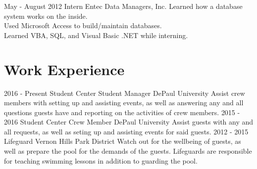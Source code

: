 \documentclass[]{resume-class}
\begin{document}
    \begin{entrylist}
        \entry
            {May - August 2012}
            {Intern}
            {Entec Data Managers, Inc.}
            {Learned how a database system works on the inside.\\
            Used Microsoft Access to build/maintain databases.\\
            Learned VBA, SQL, and Visual Basic .NET while interning.}
    \end{entrylist}

\section{Work Experience}

    \begin{entrylist}
        \entry
            {2016 - Present}
            {Student Center Student Manager}
            {DePaul University}
            {Assist crew members with setting up and assisting events, as well as answering any and all questions guests have and reporting on the activities of crew members.}
        \entry
            {2015 - 2016}
            {Student Center Crew Member}
            {DePaul University}
            {Assist guests with any and all requests, as well as seting up and assisting events for said guests.}
        \entry
            {2012 - 2015}
            {Lifeguard}
            {Vernon Hills Park District}
            {Watch out for the wellbeing of guests, as well as prepare the pool for the demands of the guests.
             Lifeguards are responsible for teaching swimming lessons in addition to guarding the pool.}
    \end{entrylist}
\end{document}
